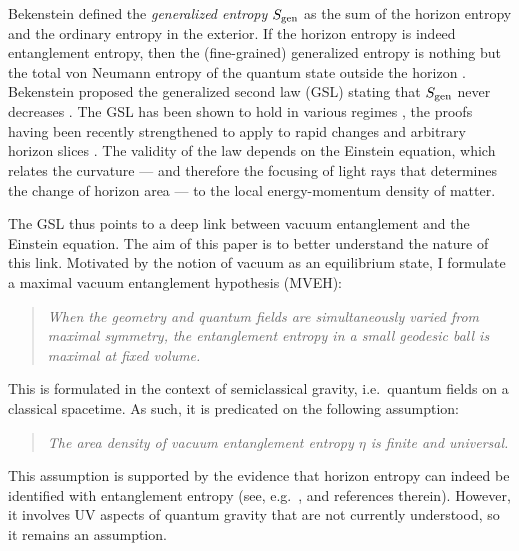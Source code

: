 \documentclass[aps,prd,twocolumn,showpacs,groupedaddress,nofootinbib,longbibliography]{revtex4-1}
\begin{document}
Bekenstein defined the {\it generalized entropy} $S_{\rm gen}$ 
as the sum of the horizon entropy and the ordinary entropy in the exterior.
If the horizon entropy is indeed entanglement entropy, then the (fine-grained) generalized entropy is nothing but the total von Neumann entropy of the quantum state outside the horizon \cite{Sorkin:1986mg,Sorkin:1997ja,Solodukhin:2011gn}. Bekenstein
proposed the generalized second law (GSL) stating that 
$S_{\rm gen}$ never decreases \cite{Bekenstein1973}. The GSL has been shown to hold in various regimes \cite{Wall10proofs}, the proofs having been recently strengthened to apply to rapid changes and arbitrary horizon slices \cite{Wall:2010cj,Wall:2011hj}. The validity of the law depends on the Einstein equation, which relates the curvature --- and therefore the focusing of light rays that determines the change of horizon area --- to the local energy-momentum density of matter. 

The GSL thus points to a deep link between vacuum entanglement and the Einstein equation. 
The aim of this paper is to better understand the nature of this link. Motivated by the notion of 
vacuum as an equilibrium state, I formulate a maximal vacuum entanglement hypothesis (MVEH):
%
\begin{quote}\it
When the geometry and quantum fields are simultaneously varied from maximal symmetry, 
the entanglement entropy in a small geodesic ball is maximal at fixed volume. 
\end{quote}
%
This is formulated in the context of semiclassical gravity, i.e.\ quantum fields on a classical spacetime.
As such, it is predicated on the following assumption:
%
\begin{quote}\it
The area density of vacuum entanglement entropy $\eta$ is finite and universal.
\end{quote}
%
This assumption is supported by the evidence that horizon entropy can indeed be identified with entanglement entropy (see, e.g.\ \cite{Solodukhin:2011gn,Jacobson:2012ek,Cooperman:2013iqr}, and references therein). 
However, it involves UV aspects of quantum gravity that are not currently understood, so it remains an assumption.
\end{document}
